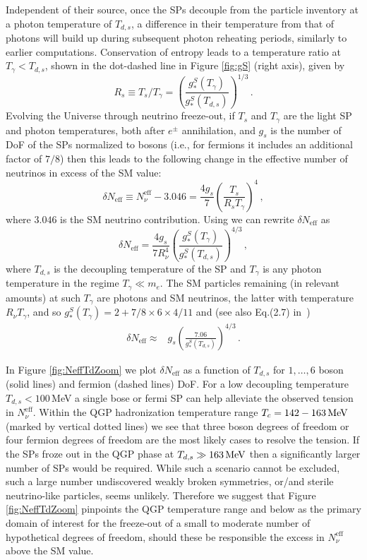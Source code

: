 Independent of their source, once the SPs decouple from the particle inventory at a photon temperature of $T_{d,s}$, a difference in their temperature from that of photons will build up during subsequent photon reheating periods, similarly to earlier computations. Conservation of entropy leads to a temperature ratio at $T_\gamma<T_{d,s}$, shown in the dot-dashed line in Figure \ref{fig:gS} (right axis), given by
\begin{equation}\label{eq:TRatio}
R_s\equiv T_{s}/T_{\gamma}=\left(\frac{g_*^S(T_\gamma)}{g_*^S(T_{d,s})}\right)^{1/3}\,.
\end{equation}
Evolving the Universe through neutrino freeze-out, if $T_s$ and $T_\gamma$ are the light SP and photon temperatures, both after $e^\pm$ annihilation, and $g_s$ is the number of DoF of the SPs normalized to bosons (i.e., for fermions it includes an additional factor of $7/8$) then this leads to the following change in the effective number of neutrinos in excess of the SM value:
\begin{equation}\label{Neff1}
\delta N_{\text{eff}}\equiv N^{\text{eff}}_{\nu}-3.046=\frac{4g_s}{7}\left(\frac{T_s}{R_s T_{\gamma}}\right)^4\,,
\end{equation}
where $3.046$ is the SM neutrino contribution. Using  we can rewrite $\delta N_{\text{eff}}$ as
\begin{equation}\label{eq:deltaN}
\delta N_{\text{eff}}=\frac{4g_s}{7R_\nu^4}\left(\frac{g_*^S(T_{\gamma})}{g_*^S(T_{d,s})}\right)^{4/3}\,,
\end{equation}
where $T_{d,s}$ is the decoupling temperature of the SP and $T_{\gamma}$ is any photon temperature in the regime $T_{\gamma}\ll m_e$. The SM particles remaining (in relevant amounts) at such $T_{\gamma}$ are photons and SM neutrinos, the latter with temperature $R_\nu T_{\gamma}$, and so $g_*^S(T_{\gamma})=2+7/8\times 6\times 4/11$ and (see also Eq.(2.7) in~\cite{Blennow:2012de})
\begin{align}\label{eq:deltaN2}
\delta N_{\text{eff}}\approx&g_s\left(\frac{7.06}{g_*^S(T_{d,s})}\right)^{4/3}\,.
\end{align}

In Figure \ref{fig:NeffTdZoom} we plot $\delta N_{\text{eff}}$ as a function of $T_{d,s}$ for $1,\dots,6$ boson (solid lines) and fermion (dashed lines) DoF. For a low decoupling temperature $T_{d,s}<100$\,MeV a single bose or fermi SP can help alleviate the observed tension in $N^{\text{eff}}_{\nu}$. Within the QGP hadronization temperature range $T_c=142-163\text{\,MeV}$ (marked by vertical dotted lines) we see that three boson degrees of freedom or four fermion degrees of freedom are the most likely cases to resolve the tension. If the SPs froze out in the QGP phase at $T_{d,s}\gg 163\text{\,MeV}$ then a significantly larger number of SPs would be required. While such a scenario cannot be excluded, such a large number undiscovered weakly broken symmetries, or/and sterile neutrino-like particles, seems unlikely. Therefore we suggest that Figure \ref{fig:NeffTdZoom} pinpoints the QGP temperature range and below as the primary domain of interest for the freeze-out of a small to moderate number of hypothetical degrees of freedom, should these be responsible the excess in $N_\nu^{\text{eff}}$ above the SM value.
